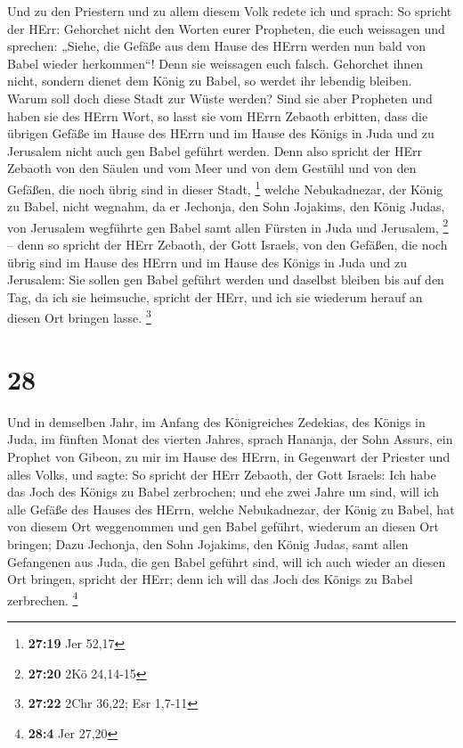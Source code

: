  Und zu den Priestern und zu allem diesem Volk redete ich
und sprach: So spricht der HErr: Gehorchet nicht den Worten eurer
Propheten, die euch weissagen und sprechen: „Siehe, die Gefäße aus dem
Hause des HErrn werden nun bald von Babel wieder herkommen``! Denn sie
weissagen euch falsch.  Gehorchet ihnen nicht, sondern
dienet dem König zu Babel, so werdet ihr lebendig bleiben. Warum soll
doch diese Stadt zur Wüste werden?  Sind sie aber Propheten
und haben sie des HErrn Wort, so lasst sie vom HErrn Zebaoth erbitten,
dass die übrigen Gefäße im Hause des HErrn und im Hause des Königs in
Juda und zu Jerusalem nicht auch gen Babel geführt werden. 
Denn also spricht der HErr Zebaoth von den Säulen und vom Meer und von
dem Gestühl und von den Gefäßen, die noch übrig sind in dieser Stadt,
\footnote{\textbf{27:19} Jer 52,17}  welche Nebukadnezar,
der König zu Babel, nicht wegnahm, da er Jechonja, den Sohn Jojakims,
den König Judas, von Jerusalem wegführte gen Babel samt allen Fürsten in
Juda und Jerusalem, \footnote{\textbf{27:20} 2Kö 24,14-15} 
-- denn so spricht der HErr Zebaoth, der Gott Israels, von den Gefäßen,
die noch übrig sind im Hause des HErrn und im Hause des Königs in Juda
und zu Jerusalem:  Sie sollen gen Babel geführt werden und
daselbst bleiben bis auf den Tag, da ich sie heimsuche, spricht der
HErr, und ich sie wiederum herauf an diesen Ort bringen lasse.
\footnote{\textbf{27:22} 2Chr 36,22; Esr 1,7-11}

\hypertarget{section-7}{%
\section{28}\label{section-7}}

 Und in demselben Jahr, im Anfang des Königreiches Zedekias,
des Königs in Juda, im fünften Monat des vierten Jahres, sprach Hananja,
der Sohn Assurs, ein Prophet von Gibeon, zu mir im Hause des HErrn, in
Gegenwart der Priester und alles Volks, und sagte:  So
spricht der HErr Zebaoth, der Gott Israels: Ich habe das Joch des Königs
zu Babel zerbrochen;  und ehe zwei Jahre um sind, will ich
alle Gefäße des Hauses des HErrn, welche Nebukadnezar, der König zu
Babel, hat von diesem Ort weggenommen und gen Babel geführt, wiederum an
diesen Ort bringen;  Dazu Jechonja, den Sohn Jojakims, den
König Judas, samt allen Gefangenen aus Juda, die gen Babel geführt sind,
will ich auch wieder an diesen Ort bringen, spricht der HErr; denn ich
will das Joch des Königs zu Babel zerbrechen. \footnote{\textbf{28:4}
  Jer 27,20}


